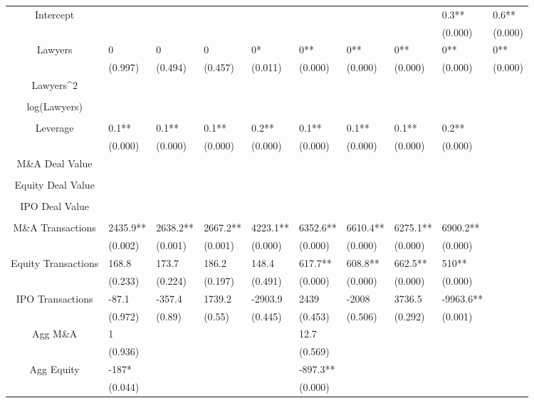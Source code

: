 \documentclass{article}
\begin{document}
\begin{table}[H]
\begin{tabular}{|clllllllll|}
Intercept &  &  &  &  &  &  &  & 0.3** & 0.6** \\ 
   &  &  &  &  &  &  &  & (0.000) & (0.000) \\ 
  Lawyers & 0 & 0 & 0 & 0* & 0** & 0** & 0** & 0** & 0** \\ 
   & (0.997) & (0.494) & (0.457) & (0.011) & (0.000) & (0.000) & (0.000) & (0.000) & (0.000) \\ 
  Lawyers^2 &  &  &  &  &  &  &  &  &  \\ 
   &  &  &  &  &  &  &  &  &  \\ 
  log(Lawyers) &  &  &  &  &  &  &  &  &  \\ 
   &  &  &  &  &  &  &  &  &  \\ 
  Leverage & 0.1** & 0.1** & 0.1** & 0.2** & 0.1** & 0.1** & 0.1** & 0.2** &  \\ 
   & (0.000) & (0.000) & (0.000) & (0.000) & (0.000) & (0.000) & (0.000) & (0.000) &  \\ 
  M\&A Deal Value &  &  &  &  &  &  &  &  &  \\ 
   &  &  &  &  &  &  &  &  &  \\ 
  Equity Deal Value &  &  &  &  &  &  &  &  &  \\ 
   &  &  &  &  &  &  &  &  &  \\ 
  IPO Deal Value &  &  &  &  &  &  &  &  &  \\ 
   &  &  &  &  &  &  &  &  &  \\ 
  M\&A Transactions & 2435.9** & 2638.2** & 2667.2** & 4223.1** & 6352.6** & 6610.4** & 6275.1** & 6900.2** &  \\ 
   & (0.002) & (0.001) & (0.001) & (0.000) & (0.000) & (0.000) & (0.000) & (0.000) &  \\ 
  Equity Transactions & 168.8 & 173.7 & 186.2 & 148.4 & 617.7** & 608.8** & 662.5** & 510** &  \\ 
   & (0.233) & (0.224) & (0.197) & (0.491) & (0.000) & (0.000) & (0.000) & (0.000) &  \\ 
  IPO Transactions & -87.1 & -357.4 & 1739.2 & -2903.9 & 2439 & -2008 & 3736.5 & -9963.6** &  \\ 
   & (0.972) & (0.89) & (0.55) & (0.445) & (0.453) & (0.506) & (0.292) & (0.001) &  \\ 
  Agg M\&A & 1 &  &  &  & 12.7 &  &  &  &  \\ 
   & (0.936) &  &  &  & (0.569) &  &  &  &  \\ 
  Agg Equity & -187* &  &  &  & -897.3** &  &  &  &  \\ 
   & (0.044) &  &  &  & (0.000) &  &  &  &  \\ 

\end{tabular}
\end{table}
\end{document}
